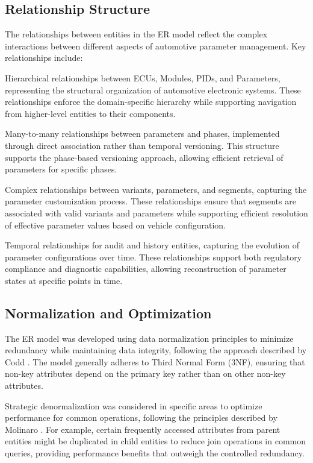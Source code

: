 \subsection{Relationship Structure}
\label{subsec:relationship-structure}

The relationships between entities in the ER model reflect the complex interactions between different aspects of automotive parameter management. Key relationships include:

Hierarchical relationships between ECUs, Modules, PIDs, and Parameters, representing the structural organization of automotive electronic systems. These relationships enforce the domain-specific hierarchy while supporting navigation from higher-level entities to their components.

Many-to-many relationships between parameters and phases, implemented through direct association rather than temporal versioning. This structure supports the phase-based versioning approach, allowing efficient retrieval of parameters for specific phases.

Complex relationships between variants, parameters, and segments, capturing the parameter customization process. These relationships ensure that segments are associated with valid variants and parameters while supporting efficient resolution of effective parameter values based on vehicle configuration.

Temporal relationships for audit and history entities, capturing the evolution of parameter configurations over time. These relationships support both regulatory compliance and diagnostic capabilities, allowing reconstruction of parameter states at specific points in time.

\subsection{Normalization and Optimization}
\label{subsec:normalization-optimization}

The ER model was developed using data normalization principles to minimize redundancy while maintaining data integrity, following the approach described by Codd \cite{codd1970relational}. The model generally adheres to Third Normal Form (3NF), ensuring that non-key attributes depend on the primary key rather than on other non-key attributes.

Strategic denormalization was considered in specific areas to optimize performance for common operations, following the principles described by Molinaro \cite{molinaro2005sql}. For example, certain frequently accessed attributes from parent entities might be duplicated in child entities to reduce join operations in common queries, providing performance benefits that outweigh the controlled redundancy.

